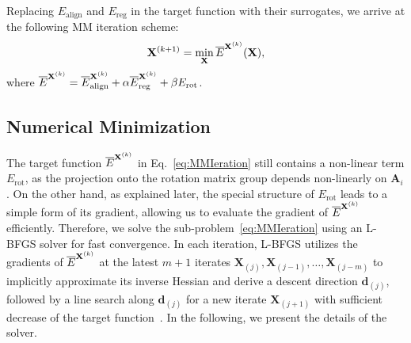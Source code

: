 Replacing ${E}_{\textrm{align}}$ and ${E}_{\textrm{reg}}$ in the target function with their surrogates, we arrive at the following MM iteration scheme:
\begin{equation}
    \mathbf{X}^{(k+1)} = \min_{\mathbf{X}} \overline{E}^{\mathbf{X}^{(k)}} (\mathbf{X}),
    \label{eq:MMIeration}
\end{equation}
where
$\overline{E}^{\mathbf{X}^{(k)}} = \overline{E}_{\text{align}}^{\mathbf{X}^{(k)}} + \alpha \overline{E}_{\text{reg}}^{\mathbf{X}^{(k)}} + \beta E_{\text{rot}}$.

\subsection{Numerical Minimization}

The target function $\overline{E}^{\mathbf{X}^{(k)}}$ in Eq.~\eqref{eq:MMIeration} still contains a non-linear term $E_{\text{rot}}$, as the projection onto the rotation matrix group depends non-linearly on $\mathbf{A}_i$. On the other hand, as explained later, the special structure of $E_{\text{rot}}$ leads to a  simple form of its gradient, allowing us to evaluate the gradient of $\overline{E}^{\mathbf{X}^{(k)}}$ efficiently. Therefore, we solve the sub-problem~\eqref{eq:MMIeration} using an L-BFGS solver for fast convergence. In each iteration, L-BFGS utilizes the gradients of $\overline{E}^{\mathbf{X}^{(k)}}$ at the latest $m+1$ iterates $\mathbf{X}_{(j)}, \mathbf{X}_{(j-1)}, \ldots, \mathbf{X}_{(j-m)}$ to implicitly approximate its inverse Hessian and derive a descent direction $\mathbf{d}_{(j)}$, followed by a line search along $\mathbf{d}_{(j)}$ for a new iterate $\mathbf{X}_{(j+1)}$ with sufficient decrease of the target function~\cite{Nocedal2006}.
In the following, we present the details of the solver.

